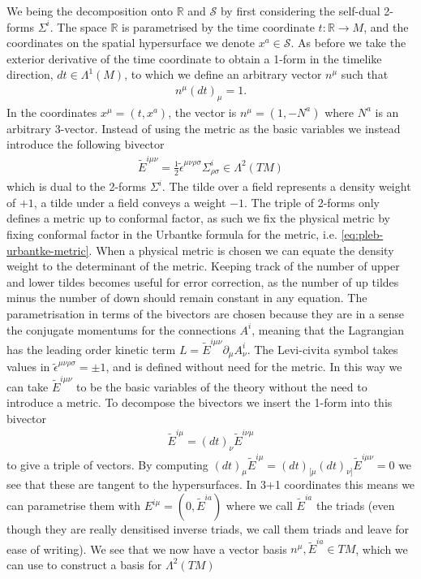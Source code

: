 \documentclass[10pt]{report}
\newcommand{\urb}[0]{Urbantke}
\theoremstyle{definition}
\newcommand{\R}[0]{\mathbb{R}}
\newcommand{\teps}[0]{\tilde{\epsilon}}
\newcommand{\tE}[0]{\tilde{E}}
\newcommand{\spasurf}[0]{\mathcal{S}}
\begin{document}
    
    We being the decomposition onto $\R$ and $\spasurf$ by first considering the self-dual 2-forms $\Sigma^i$. The space $\R$ is parametrised by the time coordinate $t : \R \rightarrow M$, and the coordinates on the spatial hypersurface we denote $x^a \in \spasurf$. As before we take the exterior derivative of the time coordinate to obtain a 1-form in the timelike direction, $dt \in \Lambda^1(M)$, to which we define an arbitrary vector $n^\mu$ such that 
    \begin{align}
        n^\mu (dt)_\mu = 1. \label{eq:num-n-and-dt-are-dot-product}
    \end{align}
    In the coordinates $x^\mu = (t,x^a)$, the vector is $n^\mu = (1,-N^a)$ where $N^a$ is an arbitrary 3-vector. Instead of using the metric as the basic variables we instead introduce the following bivector 
    \begin{align}
        \tE^{i\mu\nu} = \frac{1}{2}\teps^{\mu\nu\rho\sigma} \Sigma^i_{\rho\sigma} \in \Lambda^2(TM) \label{eq:num-tilde-E-in-eps-S}
    \end{align}
    which is dual to the 2-forms $\Sigma^i$. The tilde over a field represents a density weight of $+1$, a tilde under a field conveys a weight $-1$. The triple of 2-forms only defines a metric up to conformal factor, as such we fix the physical metric by fixing conformal factor in the \urb{} formula for the metric, i.e. \cref{eq:pleb-urbantke-metric}. When a physical metric is chosen we can equate the density weight to the determinant of the metric. Keeping track of the number of upper and lower tildes becomes useful for error correction, as the number of up tildes minus the number of down should remain constant in any equation. The parametrisation in terms of the bivectors are chosen because they are in a sense the conjugate momentums for the connections $A^i$, meaning that the Lagrangian has the leading order kinetic term $L = \tE^{i\mu\nu} \partial_\mu A^i_\nu$. The Levi-civita symbol takes values in $\teps^{\mu\nu\rho\sigma} = \pm 1$, and is defined without need for the metric. In this way we can take $\tE^{i\mu\nu}$ to be the basic variables of the theory without the need to introduce a metric. To decompose the bivectors we insert the 1-form into this bivector 
    \begin{align}
        \tE^{i\mu} = (dt)_\nu \tE^{i\nu\mu} \label{eq:num-4-variant-triad-definition}
    \end{align}
    to give a triple of vectors. By computing $(dt)_\mu \tE^{i\mu} = (dt)_{[\mu} (dt)_{\nu]} \tE^{i\mu\nu} = 0$ we see that these are tangent to the hypersurfaces. In 3+1 coordinates this means we can parametrise them with $E^{i\mu} = (0,\tE^{ia})$ where we call $\tE^{ia}$ the triads (even though they are really densitised inverse triads, we call them triads and leave for ease of writing). We see that we now have a vector basis $n^\mu, \tE^{ia} \in TM$, which we can use to construct a basis for $\Lambda^2(TM)$
\end{document}
